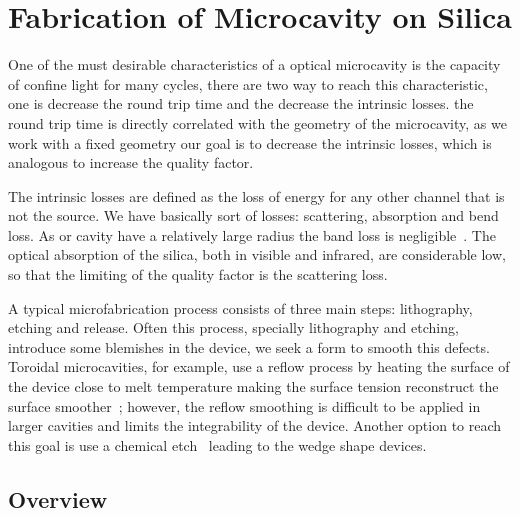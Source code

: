 \chapter{Fabrication of Microcavity on Silica}
\label{chap:4_fabrication}
One of the must desirable characteristics of a optical microcavity is the capacity of confine light for many cycles, there are two way to reach this characteristic, one is decrease the round trip time and the decrease the intrinsic losses. the round trip time is directly correlated with the geometry of the microcavity, as we work with a fixed geometry our goal is to decrease the intrinsic losses, which is analogous to increase the quality factor. 

The intrinsic losses are defined as the loss of energy for any other channel that is not the source. We have basically sort of losses: scattering, absorption and bend loss. As or cavity have a relatively large radius the band loss is negligible~\cite{Dumon2004}. The optical absorption of the silica, both in visible and infrared, are considerable low, so that the limiting of the quality factor is the scattering loss. 

A typical microfabrication process consists of three main steps: lithography, etching and release. Often this process, specially lithography and etching, introduce some blemishes in the device, we seek a form to smooth this defects.
Toroidal microcavities, for example, use a reflow process by heating the surface of the device close to melt temperature making the surface tension reconstruct the surface smoother~\cite{Ling11}; however, the reflow smoothing is difficult to be applied in larger cavities and limits the integrability of the device. Another option to reach this goal is use a chemical etch~\cite{Lee2012} leading to the wedge shape devices. 


\section{Overview}

